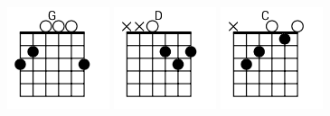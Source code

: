 \begin{figure}[h]
\predtitle\centering
\includegraphics[width=3cm]{../Akordy/g.png}
\includegraphics[width=3cm]{../Akordy/d.png}
\includegraphics[width=3cm]{../Akordy/c.png}
\end{figure}
